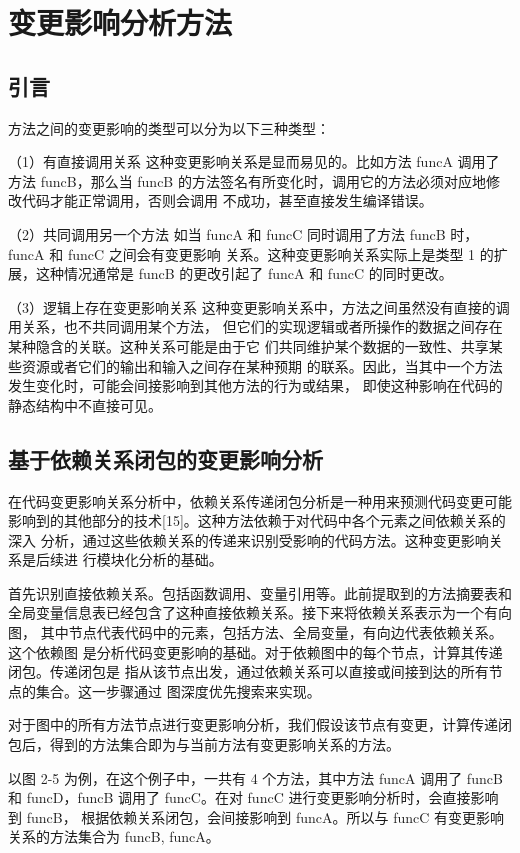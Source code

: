 \chapter{变更影响分析方法}
\section{引言}
方法之间的变更影响的类型可以分为以下三种类型：

（1）有直接调用关系
这种变更影响关系是显而易见的。比如方法 funcA 调用了方法 funcB，那么当 funcB
的方法签名有所变化时，调用它的方法必须对应地修改代码才能正常调用，否则会调用
不成功，甚至直接发生编译错误。

（2）共同调用另一个方法
如当 funcA 和 funcC 同时调用了方法 funcB 时，funcA 和 funcC 之间会有变更影响
关系。这种变更影响关系实际上是类型 1 的扩展，这种情况通常是 funcB 的更改引起了
funcA 和 funcC 的同时更改。

（3）逻辑上存在变更影响关系
这种变更影响关系中，方法之间虽然没有直接的调用关系，也不共同调用某个方法，
但它们的实现逻辑或者所操作的数据之间存在某种隐含的关联。这种关系可能是由于它
们共同维护某个数据的一致性、共享某些资源或者它们的输出和输入之间存在某种预期
的联系。因此，当其中一个方法发生变化时，可能会间接影响到其他方法的行为或结果，
即使这种影响在代码的静态结构中不直接可见。

\section{基于依赖关系闭包的变更影响分析}

在代码变更影响关系分析中，依赖关系传递闭包分析是一种用来预测代码变更可能
影响到的其他部分的技术[15]。这种方法依赖于对代码中各个元素之间依赖关系的深入
分析，通过这些依赖关系的传递来识别受影响的代码方法。这种变更影响关系是后续进
行模块化分析的基础。

首先识别直接依赖关系。包括函数调用、变量引用等。此前提取到的方法摘要表和
全局变量信息表已经包含了这种直接依赖关系。接下来将依赖关系表示为一个有向图，
其中节点代表代码中的元素，包括方法、全局变量，有向边代表依赖关系。这个依赖图
是分析代码变更影响的基础。对于依赖图中的每个节点，计算其传递闭包。传递闭包是
指从该节点出发，通过依赖关系可以直接或间接到达的所有节点的集合。这一步骤通过
图深度优先搜索来实现。

对于图中的所有方法节点进行变更影响分析，我们假设该节点有变更，计算传递闭
包后，得到的方法集合即为与当前方法有变更影响关系的方法。

以图 2-5 为例，在这个例子中，一共有 4 个方法，其中方法 funcA 调用了 funcB 和
funcD，funcB 调用了 funcC。在对 funcC 进行变更影响分析时，会直接影响到 funcB，
根据依赖关系闭包，会间接影响到 funcA。所以与 funcC 有变更影响关系的方法集合为
{funcB, funcA}。

